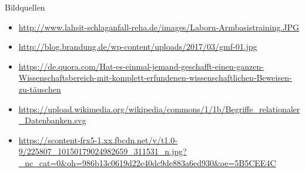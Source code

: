 \documentclass[hyphens]{beamer}
\begin{document}
 \begin{frame}{Bildquellen}
\begin{itemize}
	\item \small{\url{http://www.lahsit-schlaganfall-reha.de/images/Laborn-Armbasistraining.JPG}}
	\item \small{\url{http://blog.brandung.de/wp-content/uploads/2017/03/gmf-01.jpg}}
	\item \small{\url{https://de.quora.com/Hat-es-einmal-jemand-geschafft-einen-ganzen-Wissenschaftsbereich-mit-komplett-erfundenen-wissenschaftlichen-Beweisen-zu-täuschen}}
	\item \small{\url{https://upload.wikimedia.org/wikipedia/commons/1/1b/Begriffe_relationaler_Datenbanken.svg}}
	\item \small{\url{https://scontent-frx5-1.xx.fbcdn.net/v/t1.0-9/225807_10150179024982659_311531_n.jpg?_nc_cat=0&oh=986b13c0619d22e40dc9de883a6ed930&oe=5B5CEE4C}}
\end{itemize}
\end{frame}

 \titlepage
\end{document}
